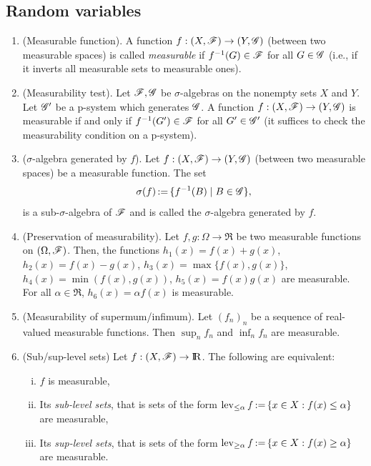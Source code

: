 \documentclass[a4paper,10pt]{scrbook}
\begin{document}
\subsection{Random variables}\label{sec:random_variables}
\begin{enumerate}

 \item (Measurable function). A function $f:(X,\mathscr{F})\to (Y,\mathscr{G})$ (between two measurable spaces) is 
       called \textit{measurable} if $f^{-1}(G) \in \mathscr{F}$ for all $G\in\mathscr{G}$ (i.e., if it inverts all 
       measurable sets to measurable ones).
       
 \item (Measurability test). Let $\mathscr{F},\mathscr{G}$ be $\sigma$-algebras on the nonempty sets $X$ and $Y$. Let $\mathscr{G}'$ be 
       a p-system which generates $\mathscr{G}$. A function $f: (X,\mathscr{F})\to (Y,\mathscr{G})$ is measurable 
       if and only if $f^{-1}(G')\in \mathscr{F}$ for all $G'\in\mathscr{G}'$ (it suffices to check the 
       measurability condition on a p-system).
       
 \item ($\sigma$-algebra generated by $f$). Let $f:(X,\mathscr{F})\to (Y,\mathscr{G})$ (between two measurable spaces) be a measurable
       function. The set 
       \[
        \sigma(f) {}\mathop{\mathrel{:}=}{} \{f^{-1}(B){}\mid{} B\in \mathscr{G}\},
       \]
       is a sub-$\sigma$-algebra of $\mathscr{F}$ and is called the $\sigma$-algebra generated by $f$.
 
 \item (Preservation of measurability). Let \(f,g:\Omega\to\Re\) be two measurable functions on \((\Omega, \mathscr{F})\).
       Then, the functions \(h_1(x) = f(x) + g(x)\), \(h_2(x) = f(x) - g(x)\),
       \(h_3(x) = \max\{f(x), g(x)\}\), \(h_4(x) = \min(f(x), g(x))\),
       \(h_5(x) = f(x)g(x)\) are measurable. For all \(\alpha\in\Re\), \(h_6(x) = \alpha f(x)\) is measurable.
       
 \item (Measurability of supermum/infimum). Let \((f_n)_n\) be a sequence of real-valued measurable 
       functions. Then \(\sup_n f_n\) and \(\inf_n f_n\) are measurable.
       
 \item (Sub/sup-level sets) Let $f:(X,\F)\to \Re$. The following are equivalent:
      \begin{enumerate}[i.]
       \item $f$ is measurable,
       \item Its \textit{sub-level sets}, that is
       sets of the form $\operatorname{lev}_{\leq \alpha} f {}\mathop{\mathrel{:}=}{} \{x\in X: f(x) \leq \alpha\}$ are measurable,
	\item Its \textit{sup-level sets},
       that is sets of the form $\operatorname{lev}_{ \geq \alpha} f {}\mathop{\mathrel{:}=}{} \{x\in X: f(x) \geq \alpha \}$ are 
       measurable. 
      \end{enumerate}


\end{enumerate}
\end{document}
